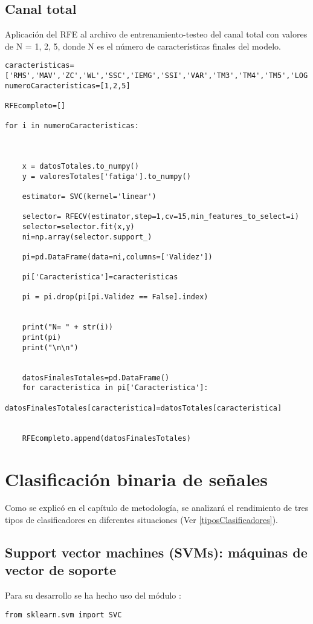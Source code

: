     \subsection{Canal total}
Aplicación del RFE al archivo de entrenamiento-testeo del canal total con valores de N = 1, 2, 5, donde N es el número de características finales del modelo.
\begin{lstlisting}
caracteristicas=['RMS','MAV','ZC','WL','SSC','IEMG','SSI','VAR','TM3','TM4','TM5','LOG','ACC','MNF','MDF']
numeroCaracteristicas=[1,2,5]

RFEcompleto=[]

for i in numeroCaracteristicas:

    
    
    x = datosTotales.to_numpy()
    y = valoresTotales['fatiga'].to_numpy()

    estimator= SVC(kernel='linear')

    selector= RFECV(estimator,step=1,cv=15,min_features_to_select=i)
    selector=selector.fit(x,y)
    ni=np.array(selector.support_)

    pi=pd.DataFrame(data=ni,columns=['Validez'])

    pi['Caracteristica']=caracteristicas

    pi = pi.drop(pi[pi.Validez == False].index)

    
    print("N= " + str(i))
    print(pi)
    print("\n\n")


    datosFinalesTotales=pd.DataFrame()
    for caracteristica in pi['Caracteristica']:
        datosFinalesTotales[caracteristica]=datosTotales[caracteristica]


    RFEcompleto.append(datosFinalesTotales)
\end{lstlisting}

\newpage
\section{Clasificación binaria de señales}
Como se explicó en el capítulo de metodología, se analizará el rendimiento de tres tipos de clasificadores en diferentes situaciones (Ver \ref{tiposClasificadores}).  
 

\subsection{ Support vector machines (SVMs): máquinas de vector de soporte}
Para su desarrollo se ha hecho uso del módulo \cite{scikitSVM}:
\begin{lstlisting}
from sklearn.svm import SVC
\end{lstlisting}

